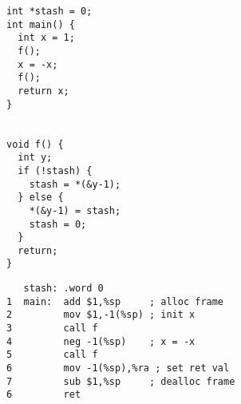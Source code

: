 \documentclass[acmsmall,review,anonymous]{acmart}\settopmatter{printfolios=true,printccs=false,printacmref=false}
\begin{document}
\begin{figure}
  \centering
  \begin{subfigure}[t]{.2\textwidth}
{\footnotesize
\begin{verbatim}
int *stash = 0;
int main() {
  int x = 1;
  f();
  x = -x;
  f();
  return x;
}


void f() {
  int y;
  if (!stash) {
    stash = *(&y-1);
  } else {
    *(&y-1) = stash;
    stash = 0;
  }
  return;
}
\end{verbatim}
}
\end{subfigure}
  \begin{subfigure}[t]{.4\textwidth}
{\footnotesize
\begin{verbatim}
   stash: .word 0
1  main:  add $1,%sp     ; alloc frame
2         mov $1,-1(%sp) ; init x
3         call f
4         neg -1(%sp)    ; x = -x
5         call f
6         mov -1(%sp),%ra ; set ret val
7         sub $1,%sp     ; dealloc frame
6         ret


\end{verbatim}}
\end{subfigure}
\end{figure}
\end{document}
